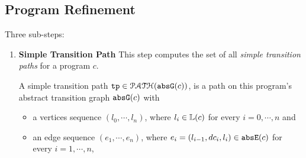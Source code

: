 \subsection{Program Refinement}
\label{sec:refine}
Three sub-steps:
\begin{enumerate}
\item \textbf{Simple Transition Path}  This step computes the set of all \emph{simple transition paths} for a program $c$.
\begin{defn}
  A simple transition path
  $\mathtt{tp} \in \mathcal{PATH}(\mathtt{abs}{\mathtt{G}}(c))$, is a path on this program's abstract transition graph $\mathtt{abs}{\mathtt{G}}(c)$ with 
  \begin{itemize}
  \item a vertices sequence $(l_0, \cdots, l_n)$, where $l_i \in \mathbb{L}(c)$ for every $i = 0, \cdots, n$ and
  \item an edge sequence $(e_1, \cdots, e_n)$, where $e_i = (l_{i - 1}, dc_i, l_{i}) \in \mathtt{abs}{\mathtt{E}}(c)$ for every $i = 1, \cdots, n$,

\end{itemize}
\end{defn}
\end{enumerate}
